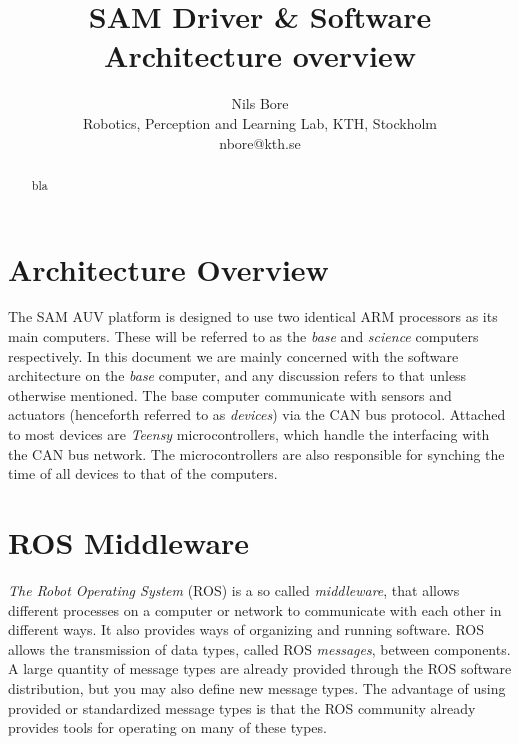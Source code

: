 \documentclass[9pt,technote]{IEEEtran} %
\begin{document}

\title{SAM Driver \& Software Architecture overview}%
\author{Nils Bore\\ %
Robotics, Perception and Learning Lab, KTH, Stockholm\\
nbore@kth.se} %

\maketitle

\begin{abstract}
bla
\end{abstract}


\section{Architecture Overview}
\label{overview}

The SAM AUV platform is designed to use two identical ARM processors as its main computers.
These will be referred to as the \textit{base} and \textit{science} computers respectively.
In this document we are mainly concerned with the software architecture on the \textit{base}
computer, and any discussion refers to that unless otherwise mentioned.
The base computer communicate with sensors and actuators (henceforth referred to as \textit{devices})
via the CAN bus protocol. Attached to most devices are \textit{Teensy} microcontrollers, which
handle the interfacing with the CAN bus network. The microcontrollers are also responsible for
synching the time of all devices to that of the computers.

\section{ROS Middleware}
\label{ros}

\textit{The Robot Operating System} (ROS) is a so called \textit{middleware}, that allows different processes on
a computer or network to communicate with each other in different ways.
It also provides ways of organizing and running software. ROS allows the transmission of data types,
called ROS \textit{messages}, between components. A large quantity of message types are already
provided through the ROS software distribution, but you may also define new message types.
The advantage of using provided or standardized message types is that the ROS community
already provides tools for operating on many of these types.
\end{document}
